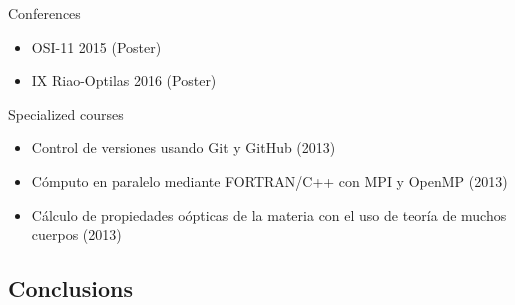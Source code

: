 \documentclass{beamer}
\begin{document}
\begin{frame}
\begin{columns}
\end{columns}

\end{frame}




\begin{frame}

{\Large Conferences}

\begin{itemize}

\item OSI-11 2015 (Poster)
\item IX Riao-Optilas 2016 (Poster)

\end{itemize}

\vspace{7mm}

{\Large Specialized courses}

\begin{itemize}

\item Control de versiones usando Git y GitHub (2013)
\item C\'omputo en paralelo mediante FORTRAN/C++ con MPI y OpenMP (2013)
\item C\'alculo de propiedades o\'opticas de la materia con el uso de teor\'ia
de muchos cuerpos (2013)

\end{itemize}


\end{frame}




\subsection{Conclusions}


\end{document}
